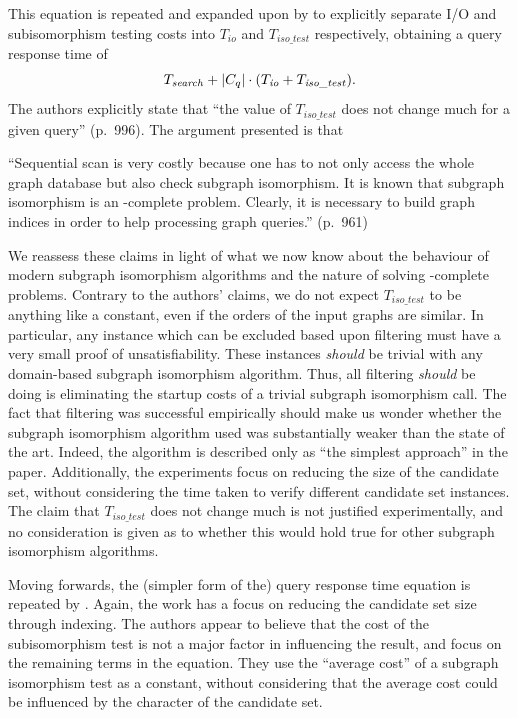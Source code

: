 \documentclass[twoside,11pt]{article}
\begin{document}
This equation is repeated and expanded upon by  to explicitly
separate I/O and subisomorphism testing costs into $T_{\mathit{io}}$ and $T_{\mathit{iso\_test}}$
respectively, obtaining a query response time of \[
    T_{\mathit{search}} + \left|C_q\right| \cdot (T_{\mathit{io}} + T_{\mathit{iso\_test}})
    \textnormal{.} \] The authors explicitly state that ``the value of $T_{\mathit{iso\_test}}$ does
not change much for a given query'' (p.\ 996). The argument presented is that
\begin{displayquote}``Sequential scan is very costly
because one has to not only access the whole graph database but also check subgraph isomorphism. It
is known that subgraph isomorphism is an \NP-complete problem. Clearly, it is necessary to build
graph indices in order to help processing graph queries.'' (p.\ 961)\end{displayquote}
We reassess these claims in light of
what we now know about the behaviour of modern subgraph isomorphism algorithms and the nature
of solving \NP-complete problems. Contrary to the authors' claims,
we do not expect $T_{\mathit{iso\_test}}$ to be anything like a constant, even if the orders of the
input graphs are similar. In particular, any instance which can be excluded based upon filtering
must have a very small proof of unsatisfiability. These instances \emph{should} be trivial with any
domain-based subgraph isomorphism algorithm. Thus, all filtering \emph{should} be doing is eliminating the startup
costs of a trivial subgraph isomorphism call. The fact that filtering was successful empirically
should make us wonder whether the subgraph isomorphism algorithm used was substantially
weaker than the state of the art.
Indeed, the algorithm is described only as ``the simplest approach'' in the
paper.  Additionally, the experiments focus on reducing the size of the candidate set, without
considering the time taken to verify different candidate set instances.  The claim that
$T_{\mathit{iso\_test}}$ does not change much is not justified experimentally, and no consideration
is given as to whether this would hold true for other subgraph isomorphism algorithms.

Moving forwards, the (simpler form of the) query response time equation is repeated by
. Again, the work has a focus on reducing the candidate set size
through indexing. The authors appear to believe that the cost of the subisomorphism test is not a major
factor in influencing the result, and focus on the remaining terms in the equation. They use the
``average cost'' of a subgraph isomorphism test as a constant, without considering that the average
cost could be influenced by the character of the candidate set.
\end{document}
